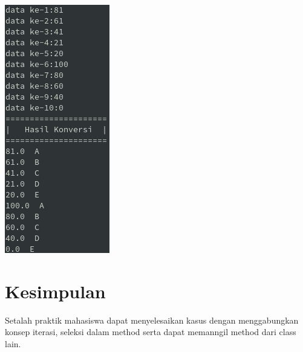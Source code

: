 \documentclass[a4paper,12pt]{article}
\begin{document}
\begin{center}
    \includegraphics[scale=1]{8.png} 
\end{center}


\newpage

\section{Kesimpulan}
Setalah praktik mahasiswa dapat menyelesaikan kasus dengan menggabungkan konsep iterasi, seleksi dalam method serta dapat memanngil
method dari class lain.
\end{document}
